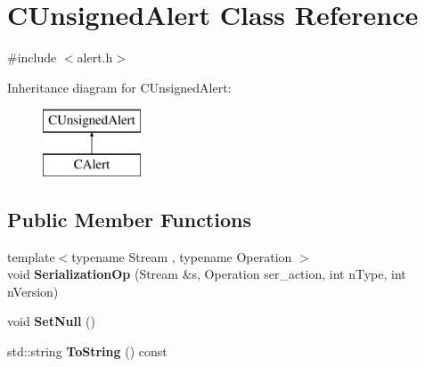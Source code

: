 \hypertarget{class_c_unsigned_alert}{}\section{C\+Unsigned\+Alert Class Reference}
\label{class_c_unsigned_alert}


{\ttfamily \#include $<$alert.\+h$>$}

Inheritance diagram for C\+Unsigned\+Alert\+:\begin{figure}[H]
\begin{center}
\leavevmode
\includegraphics[height=2.000000cm]{class_c_unsigned_alert}
\end{center}
\end{figure}
\subsection*{Public Member Functions}
\begin{DoxyCompactItemize}
\item 
\mbox{\label{class_c_unsigned_alert_acdf81abb731f9fc8d2c04618f2f4d79d}} 
{\footnotesize template$<$typename Stream , typename Operation $>$ }\\void {\bfseries Serialization\+Op} (Stream \&s, Operation ser\+\_\+action, int n\+Type, int n\+Version)
\item 
\mbox{\label{class_c_unsigned_alert_a9d387307eb60095e50134d10eea3ad69}} 
void {\bfseries Set\+Null} ()
\item 
\mbox{\label{class_c_unsigned_alert_a1ba948e1de4803565ec0dbec267eadb4}} 
std\+::string {\bfseries To\+String} () const
\end{DoxyCompactItemize}
